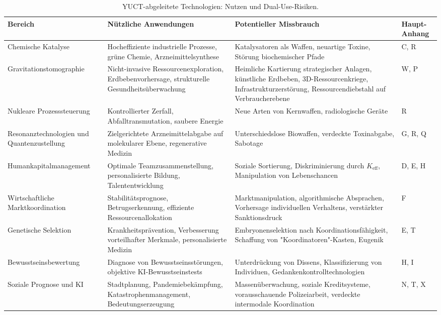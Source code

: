 \documentclass[12pt,a4paper]{article}
\theoremstyle{remark}
\newcommand{\Keff}{K_{\mathrm{eff}}}
\begin{document}
	\begin{table}[htbp]
		\centering
		\caption{YUCT-abgeleitete Technologien: Nutzen und Dual-Use-Risiken.}
		\label{tab:tech-summary}
		\small
		\begin{tabularx}{\textwidth}{p{2.8cm}Xp{3.5cm}p{2.5cm}}
			\toprule
			\textbf{Bereich} & \textbf{Nützliche Anwendungen} & \textbf{Potentieller Missbrauch} & \textbf{Haupt-Anhang} \\
			\midrule
			Chemische Katalyse & Hocheffiziente industrielle Prozesse, grüne Chemie, Arzneimittelsynthese & Katalysatoren als Waffen, neuartige Toxine, Störung biochemischer Pfade & C, R \\
			Gravitationstomographie & Nicht-invasive Ressourcenexploration, Erdbebenvorhersage, strukturelle Gesundheitsüberwachung & Heimliche Kartierung strategischer Anlagen, künstliche Erdbeben, 3D-Ressourcenkriege, Infrastrukturzerstörung, Ressourcendiebstahl auf Verbraucherebene & W, P \\
			Nukleare Prozesssteuerung & Kontrollierter Zerfall, Abfalltransmutation, saubere Energie & Neue Arten von Kernwaffen, radiologische Geräte & R \\
			Resonanztechnologien und Quantenzustellung & Zielgerichtete Arzneimittelabgabe auf molekularer Ebene, regenerative Medizin & Unterschiedslose Biowaffen, verdeckte Toxinabgabe, Sabotage & G, R, Q \\
			Humankapitalmanagement & Optimale Teamzusammenstellung, personalisierte Bildung, Talententwicklung & Soziale Sortierung, Diskriminierung durch \(\Keff\), Manipulation von Lebenschancen & D, E, H \\
			Wirtschaftliche Marktkoordination & Stabilitätsprognose, Betrugserkennung, effiziente Ressourcenallokation & Marktmanipulation, algorithmische Absprachen, Vorhersage individuellen Verhaltens, verstärkter Sanktionsdruck & F \\
			Genetische Selektion & Krankheitsprävention, Verbesserung vorteilhafter Merkmale, personalisierte Medizin & Embryonenselektion nach Koordinationsfähigkeit, Schaffung von "Koordinatoren"-Kasten, Eugenik & E, T \\
			Bewusstseinsbewertung & Diagnose von Bewusstseinsstörungen, objektive KI-Bewusstseinstests & Unterdrückung von Dissens, Klassifizierung von Individuen, Gedankenkontrolltechnologien & H, I \\
			Soziale Prognose und KI & Stadtplanung, Pandemiebekämpfung, Katastrophenmanagement, Bedeutungserzeugung & Massenüberwachung, soziale Kreditsysteme, vorausschauende Polizeiarbeit, verdeckte intermodale Koordination & N, T, X \\
			\bottomrule
		\end{tabularx}
	\end{table}
	
\end{document}

